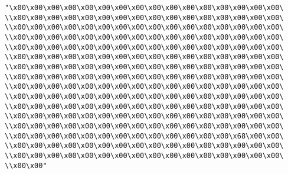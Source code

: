 \verb|"\x00\x00\x00\x00\x00\x00\x00\x00\x00\x00\x00\x00\x00\x00\x00\x00\|\newline
\verb|\\x00\x00\x00\x00\x00\x00\x00\x00\x00\x00\x00\x00\x00\x00\x00\x00\|\newline
\verb|\\x00\x00\x00\x00\x00\x00\x00\x00\x00\x00\x00\x00\x00\x00\x00\x00\|\newline
\verb|\\x00\x00\x00\x00\x00\x00\x00\x00\x00\x00\x00\x00\x00\x00\x00\x00\|\newline
\verb|\\x00\x00\x00\x00\x00\x00\x00\x00\x00\x00\x00\x00\x00\x00\x00\x00\|\newline
\verb|\\x00\x00\x00\x00\x00\x00\x00\x00\x00\x00\x00\x00\x00\x00\x00\x00\|\newline
\verb|\\x00\x00\x00\x00\x00\x00\x00\x00\x00\x00\x00\x00\x00\x00\x00\x00\|\newline
\verb|\\x00\x00\x00\x00\x00\x00\x00\x00\x00\x00\x00\x00\x00\x00\x00\x00\|\newline
\verb|\\x00\x00\x00\x00\x00\x00\x00\x00\x00\x00\x00\x00\x00\x00\x00\x00\|\newline
\verb|\\x00\x00\x00\x00\x00\x00\x00\x00\x00\x00\x00\x00\x00\x00\x00\x00\|\newline
\verb|\\x00\x00\x00\x00\x00\x00\x00\x00\x00\x00\x00\x00\x00\x00\x00\x00\|\newline
\verb|\\x00\x00\x00\x00\x00\x00\x00\x00\x00\x00\x00\x00\x00\x00\x00\x00\|\newline
\verb|\\x00\x00\x00\x00\x00\x00\x00\x00\x00\x00\x00\x00\x00\x00\x00\x00\|\newline
\verb|\\x00\x00\x00\x00\x00\x00\x00\x00\x00\x00\x00\x00\x00\x68\x00\x00\|\newline
\verb|\\x00\x00\x00\x00\x00\x00\x00\x00\x00\x00\x00\x00\x00\x00\x00\x00\|\newline
\verb|\\x00\x00\x00\x00\x00\x00\x00\x00\x00\x00\x00\x00\x00\x00\x00\x00\|\newline
\verb|\\x00\x00"|\newline
